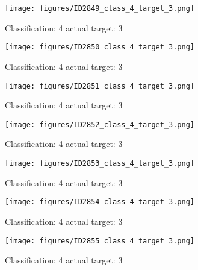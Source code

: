 \begin{figure}[h!]
\begin{center}
\texttt{[image: figures/ID2849\_class\_4\_target\_3.png]}
\end{center}
\caption{ Classification: 4 actual target: 3}
\label{fig:ID2849_class_4_target_3}
\end{figure}
\begin{figure}[h!]
\begin{center}
\texttt{[image: figures/ID2850\_class\_4\_target\_3.png]}
\end{center}
\caption{ Classification: 4 actual target: 3}
\label{fig:ID2850_class_4_target_3}
\end{figure}
\begin{figure}[h!]
\begin{center}
\texttt{[image: figures/ID2851\_class\_4\_target\_3.png]}
\end{center}
\caption{ Classification: 4 actual target: 3}
\label{fig:ID2851_class_4_target_3}
\end{figure}
\begin{figure}[h!]
\begin{center}
\texttt{[image: figures/ID2852\_class\_4\_target\_3.png]}
\end{center}
\caption{ Classification: 4 actual target: 3}
\label{fig:ID2852_class_4_target_3}
\end{figure}
\begin{figure}[h!]
\begin{center}
\texttt{[image: figures/ID2853\_class\_4\_target\_3.png]}
\end{center}
\caption{ Classification: 4 actual target: 3}
\label{fig:ID2853_class_4_target_3}
\end{figure}
\begin{figure}[h!]
\begin{center}
\texttt{[image: figures/ID2854\_class\_4\_target\_3.png]}
\end{center}
\caption{ Classification: 4 actual target: 3}
\label{fig:ID2854_class_4_target_3}
\end{figure}
\begin{figure}[h!]
\begin{center}
\texttt{[image: figures/ID2855\_class\_4\_target\_3.png]}
\end{center}
\caption{ Classification: 4 actual target: 3}
\label{fig:ID2855_class_4_target_3}
\end{figure}
